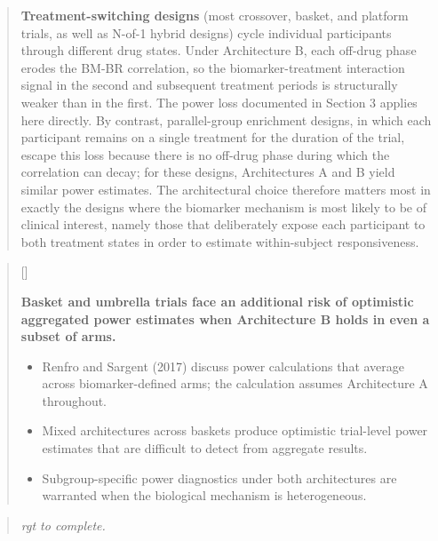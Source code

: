 \documentclass[
  11pt,
]{article}
\newcounter{pgraph}
\newenvironment{bullets}{%
  \stepcounter{pgraph}%
  \begin{quote}\small\sffamily\color[gray]{0.30}%
  {\normalfont\scriptsize\color[gray]{0.58}[\thepgraph]\enspace}}{%
  \end{quote}}
\newenvironment{rgt}{%
  \begin{quote}\small\itshape\color[RGB]{20,60,160}}{%
  \end{quote}}
\newenvironment{orig}{%
  \begin{quote}\normalsize\color[gray]{0.55}}{%
  \end{quote}}
\begin{document}
\begin{orig}
\textbf{Treatment-switching designs} (most crossover, basket, and
platform trials, as well as N-of-1 hybrid designs) cycle individual
participants through different drug states. Under Architecture B, each
off-drug phase erodes the BM-BR correlation, so the biomarker-treatment
interaction signal in the second and subsequent treatment periods is
structurally weaker than in the first. The power loss documented in
Section 3 applies here directly. By contrast, parallel-group enrichment
designs, in which each participant remains on a single treatment for the
duration of the trial, escape this loss because there is no off-drug
phase during which the correlation can decay; for these designs,
Architectures A and B yield similar power estimates. The architectural
choice therefore matters most in exactly the designs where the biomarker
mechanism is most likely to be of clinical interest, namely those that
deliberately expose each participant to both treatment states in order
to estimate within-subject responsiveness.

\end{orig}

\begin{bullets}

\textbf{Basket and umbrella trials face an additional risk of
optimistic aggregated power estimates when Architecture B holds
in even a subset of arms.}

\begin{itemize}\setlength{\itemsep}{2pt}\setlength{\parskip}{0pt}
\item Renfro and Sargent (2017) discuss power calculations that
  average across biomarker-defined arms; the calculation assumes
  Architecture A throughout.
\item Mixed architectures across baskets produce optimistic
  trial-level power estimates that are difficult to detect from
  aggregate results.
\item Subgroup-specific power diagnostics under both
  architectures are warranted when the biological mechanism is
  heterogeneous.
\end{itemize}

\end{bullets}

\begin{rgt}
rgt to complete.

\end{rgt}
\end{document}
